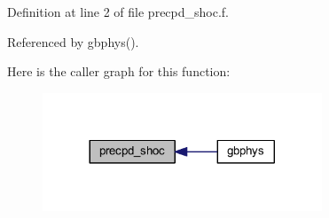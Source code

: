 Definition at line 2 of file precpd\+\_\+shoc.\+f.



Referenced by gbphys().



Here is the caller graph for this function\+:\nopagebreak
\begin{figure}[H]
\begin{center}
\leavevmode
\includegraphics[width=236pt]{precpd__shoc_8f_a9dc8dede4aa2694932f96efe2fb29608_icgraph}
\end{center}
\end{figure}



